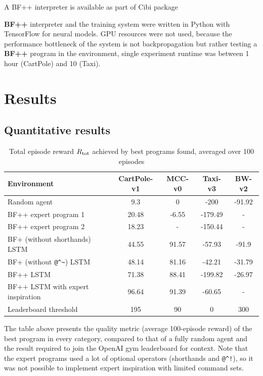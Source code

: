 \begin{remark}
    A BF++ interpreter is available as part of Cibi \cite{liventsevVadim0x60Cibi2024} package
\end{remark}

\textbf{BF++} interpreter and the training system were written in Python with TensorFlow for neural models.
GPU resources were not used, because the performance bottleneck of the system is not backpropagation but rather testing a \textbf{BF++} program in the environment, single experiment runtime was between 1 hour (CartPole) and 10 (Taxi).

\newpage
\section{Results}

\subsection{Quantitative results}

\begin{table}[H]
  \caption{Total episode reward $R_\text{tot}$ achieved by best programs found, averaged over 100 episodes}
  \label{tab:quality}
  \centering
  \begin{tabular}{lcccc}
    Environment     & CartPole-v1     & MCC-v0 & Taxi-v3 & BW-v2 \\
    \midrule
    Random agent & 9.3 & 0 & -200 & -91.92  \\
    \midrule
    BF++ expert program 1 & 20.48 & -6.55 & -179.49 & - \\
    BF++ expert program 2 & 18.23 & - & -150.44 & - \\
    BF+ (without shorthands) LSTM & 44.55 & 91.57 & -57.93 & -91.9 \\
    BF+ (without \verb|@^~|) LSTM & 48.14 & 81.16 & -42.21 & -31.79 \\
    BF++ LSTM     & 71.38 & 88.41 & -199.82 & -26.97 \\
    BF++ LSTM with expert inspiration  & 96.64 & 91.39 & -60.65 & - \\
    \midrule
    Leaderboard threshold & 195 & 90 & 0 & 300 \\
    \bottomrule
  \end{tabular}
\end{table}

The table above presents the quality metric (average 100-episode reward) of the best program in every category, compared to that of a fully random agent and the result required to join the OpenAI gym leaderboard for context.
Note that the expert programs used a lot of optional operators (shorthands and \verb|@^!|), so it was not possible to implement expert inspiration with limited command sets.

